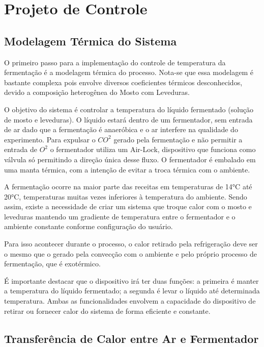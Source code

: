 \section{Projeto de Controle}

\subsection{Modelagem Térmica do Sistema}

O primeiro passo para a implementação do controle de temperatura da fermentação é a modelagem térmica do processo. Nota-se que essa modelagem é bastante complexa pois envolve diversos coeficientes térmicos desconhecidos, devido a composição heterogênea do Mosto com Leveduras. 

O objetivo do sistema é controlar a temperatura do líquido fermentado (solução de mosto e leveduras). O líquido estará dentro de um fermentador, sem entrada de ar dado que a fermentação é anaeróbica e o ar interfere na qualidade do experimento. Para expulsar o $CO^2$ gerado pela fermentação e não permitir a entrada de $O^2$ o fermentador utiliza um Air-Lock, dispositivo que funciona como válvula só permitindo a direção única desse fluxo. O fermentador é embalado em uma manta térmica, com a intenção de evitar a troca térmica com o ambiente.

A fermentação ocorre na maior  parte das receitas em temperaturas de 14°C até 20°C,  temperaturas muitas vezes inferiores à temperatura do ambiente. Sendo assim, existe a necessidade de criar um sistema que troque calor com o mosto e leveduras mantendo um gradiente de temperatura entre o fermentador e o ambiente constante conforme configuração do usuário. 

Para isso acontecer durante o processo, o calor retirado pela refrigeração deve ser o mesmo que o gerado pela convecção com o ambiente e pelo próprio processo de fermentação, que é exotérmico. 


É importante destacar que o dispositivo irá ter duas funções: a primeira é manter a temperatura do líquido fermentado; a segunda é levar o líquido até determinada temperatura. Ambas as funcionalidades envolvem a capacidade do dispositivo de retirar ou fornecer calor do sistema de forma eficiente e constante. 


\subsection{Transferência de Calor entre Ar e Fermentador}

